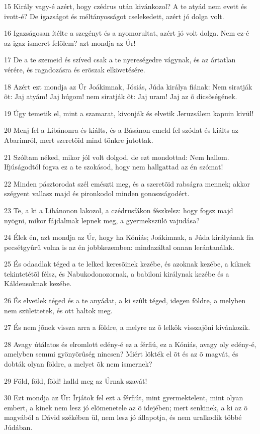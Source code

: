 \par 15 Király vagy-é azért, hogy czédrus után kivánkozol? A te atyád nem evett és ivott-é? De igazságot és méltányosságot cselekedett, azért jó dolga volt.
\par 16 Igazságosan ítélte a szegényt és a nyomorultat, azért jó volt dolga. Nem ez-é az igaz ismeret felõlem? azt mondja az Úr!
\par 17 De a te szemeid és szíved csak a te nyereségedre vágynak, és az ártatlan vérére, és ragadozásra és erõszak elkövetésére.
\par 18 Azért ezt mondja az Úr Joákimnak, Jósiás, Júda királya fiának: Nem siratják õt: Jaj atyám! Jaj húgom! nem siratják õt: Jaj uram! Jaj az õ dicsõségének.
\par 19 Úgy temetik el, mint a szamarat, kivonják és elvetik Jeruzsálem kapuin kivül!
\par 20 Menj fel a Libánonra és kiálts, és a Básánon emeld fel szódat és kiálts az Abarimról, mert szeretõid mind tönkre jutottak.
\par 21 Szóltam néked, mikor jól volt dolgod, de ezt mondottad: Nem hallom. Ifjúságodtól fogva ez a te szokásod, hogy nem hallgattad az én szómat!
\par 22 Minden pásztorodat szél emészti meg, és a szeretõid rabságra mennek; akkor szégyent vallasz majd és pironkodol minden gonoszságodért.
\par 23 Te, a ki a Libánonon lakozol, a czédrusfákon fészkelsz: hogy fogsz majd nyögni, mikor fájdalmak lepnek meg, a gyermekszülõ vajudása?
\par 24 Élek én, azt mondja az Úr, hogy ha Kóniás; Joákimnak, a Júda királyának fia pecsétgyûrû  volna is az én jobbkezemben: mindazáltal onnan lerántanálak.
\par 25 És odaadlak téged a te lelked keresõinek kezébe, és azoknak kezébe, a kiknek tekintetétõl félsz, és Nabukodonozornak, a babiloni királynak kezébe és a Káldeusoknak kezébe.
\par 26 És elvetlek téged és a te anyádat, a ki szûlt téged, idegen földre, a melyben nem születtetek, és ott haltok meg.
\par 27 És nem jõnek vissza arra a földre, a melyre az õ lelkök visszajõni kivánkozik.
\par 28 Avagy útálatos és elromlott edény-é ez a férfiú, ez a Kóniás, avagy oly edény-é, amelyben semmi gyönyörûség nincsen? Miért lökték el õt és az õ magvát, és dobták olyan földre, a melyet õk nem ismernek?
\par 29 Föld, föld, föld! halld meg az Úrnak szavát!
\par 30 Ezt mondja az Úr: Írjátok fel ezt a férfiút, mint gyermektelent, mint olyan embert, a kinek nem lesz jó elõmenetele az õ idejében; mert senkinek, a ki az õ magvából a Dávid székében ül, nem lesz jó állapotja, és nem uralkodik többé Júdában.

